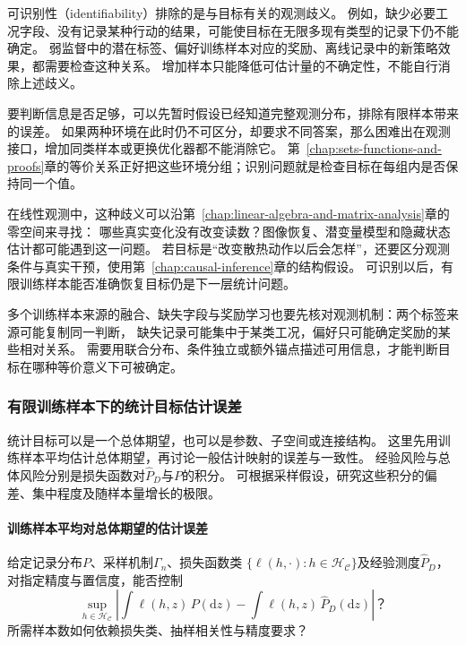 可识别性（identifiability）排除的是与目标有关的观测歧义。
例如，缺少必要工况字段、没有记录某种行动的结果，可能使目标在无限多现有类型的记录下仍不能确定。
弱监督中的潜在标签、偏好训练样本对应的奖励、离线记录中的新策略效果，都需要检查这种关系。
增加样本只能降低可估计量的不确定性，不能自行消除上述歧义。

要判断信息是否足够，可以先暂时假设已经知道完整观测分布，排除有限样本带来的误差。
如果两种环境在此时仍不可区分，却要求不同答案，那么困难出在观测接口，增加同类样本或更换优化器都不能消除它。
第~\ref{chap:sets-functions-and-proofs}章的等价关系正好把这些环境分组；识别问题就是检查目标在每组内是否保持同一个值。

在线性观测中，这种歧义可以沿第~\ref{chap:linear-algebra-and-matrix-analysis}章的零空间来寻找：
哪些真实变化没有改变读数？图像恢复、潜变量模型和隐藏状态估计都可能遇到这一问题。
若目标是“改变散热动作以后会怎样”，还要区分观测条件与真实干预，使用第~\ref{chap:causal-inference}章的结构假设。
可识别以后，有限训练样本能否准确恢复目标仍是下一层统计问题。

多个训练样本来源的融合、缺失字段与奖励学习也要先核对观测机制：两个标签来源可能复制同一判断，
缺失记录可能集中于某类工况，偏好只可能确定奖励的某些相对关系。
需要用联合分布、条件独立或额外锚点描述可用信息，才能判断目标在哪种等价意义下可被确定。

\subsubsection{有限训练样本下的统计目标估计误差}
\label{sec:future-analysis-generalization}

统计目标可以是一个总体期望，也可以是参数、子空间或连接结构。
这里先用训练样本平均估计总体期望，再讨论一般估计映射的误差与一致性。
经验风险与总体风险分别是损失函数对$\widehat P_D$与$P$的积分。
可根据采样假设，研究这些积分的偏差、集中程度及随样本量增长的极限。

\paragraph{训练样本平均对总体期望的估计误差}

\begin{mathproblem}[有限训练样本对总体泛函的近似]
  \label{question:future-generalization}
  给定记录分布$P$、采样机制$\Gamma_n$、损失函数类
  $\{\ell(h,\cdot):h\in\mathcal H_{\mathcal C}\}$及经验测度$\widehat P_D$，
  对指定精度与置信度，能否控制
  \[
    \sup_{h\in\mathcal H_{\mathcal C}}
      \left|\int\ell(h,z)\,P(\mathrm dz)
      -\int\ell(h,z)\,\widehat P_D(\mathrm dz)\right|\text{？}
  \]
  所需样本数如何依赖损失类、抽样相关性与精度要求？
\end{mathproblem}

